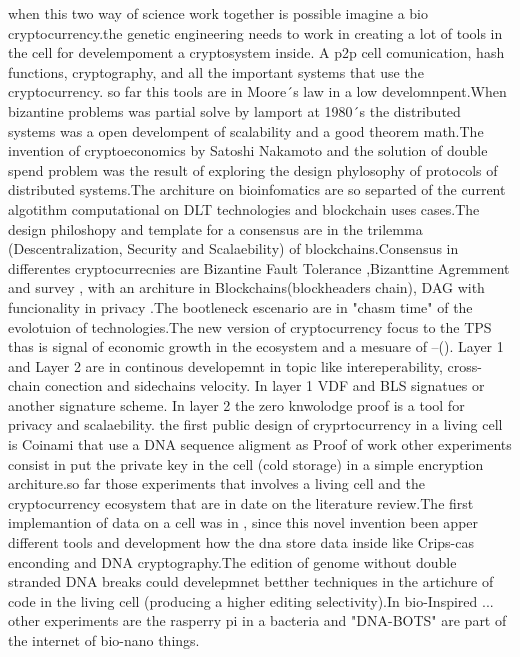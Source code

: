 \documentclass{article}
\begin{document}
when this two way of science work together is possible imagine a bio cryptocurrency.the genetic engineering needs to work in creating a lot of tools in the cell for develempoment a cryptosystem inside. A p2p cell comunication, hash functions, cryptography, and all the important systems that use the cryptocurrency\cite{article2}\cite{8014672}\cite{10.1093/rfs/hhy095}. so far this tools are in Moore´s law\cite{Schaller:1997:MLP:254613.254618} in a low develomnpent.When bizantine problems was partial solve by lamport at 1980´s \cite{Lamport:1982:BGP:357172.357176} the distributed systems was a open develompent of scalability and a good theorem math.The invention of cryptoeconomics by Satoshi Nakamoto\cite{nakamoto2012bitcoin} and the solution of double spend problem was the result of exploring the design phylosophy of protocols of distributed systems\cite{Back02hashcash-}\cite{Dang:2016:PMS:2935634.2935638}.The architure on bioinfomatics are so separted of the current algotithm computational on DLT technologies and blockchain uses cases.The design philoshopy and template for a consensus are in the trilemma (Descentralization, Security and Scalaebility) of blockchains\cite{RePEc:nbr:nberwo:25407}.Consensus in differentes cryptocurrecnies are Bizantine Fault Tolerance \cite{Castro:1999:PBF:296806.296824},Bizanttine Agremment\cite{DBLP:journals/corr/Micali16} and  survey , with an architure in Blockchains(blockheaders chain), DAG\cite{10.1007/978-3-030-13651-2_11} with funcionality in privacy\cite{inproceedingszcash} .The bootleneck escenario\cite{inproceedings}\cite{inproceedings2} are  in "chasm time" of the evolotuion of technologies\cite{Polhill2019}.The new version of cryptocurrency focus to the TPS thas is signal of economic growth in the ecosystem and a mesuare of --(). Layer 1 and Layer 2 are in continous developemnt in topic like intereperability, cross-chain conection and sidechains velocity. In layer 1 VDF and BLS signatues or another signature scheme. In layer 2 the zero knwolodge proof\cite{DBLP:conf/crypto/Ben-SassonBHR19} is a tool for privacy\cite{Kappos:2018:EAA:3277203.3277238} and scalaebility\cite{cryptoeprint:2019:550}. the first public design of cryprtocurrency in a living cell is Coinami\cite{Ileri2016CoinamiAC} that use a DNA  sequence aligment as Proof of work other experiments consist in put the private key in the cell (cold storage) in a simple encryption architure.so far those experiments that involves a living cell and the cryptocurrency ecosystem that are in date on the literature review.The first implemantion of data on a cell was in , since this novel invention been apper different tools and development how the dna store data inside like Crips-cas enconding\cite{Shipman2016MolecularRB} and DNA cryptography\cite{8212786}.The edition of genome without double stranded DNA breaks could develepmnet betther techniques in the artichure of code in the living cell (producing a higher editing selectivity)\cite{article}.In bio-Inspired \cite{Ser2019BioinspiredCW}... other experiments are the rasperry pi in a bacteria \cite{inproceedings423}and  "DNA-BOTS" \cite{Storch832139} are part of the internet of bio-nano things\cite{Akyildiz2015TheIO}.
\end{document}
